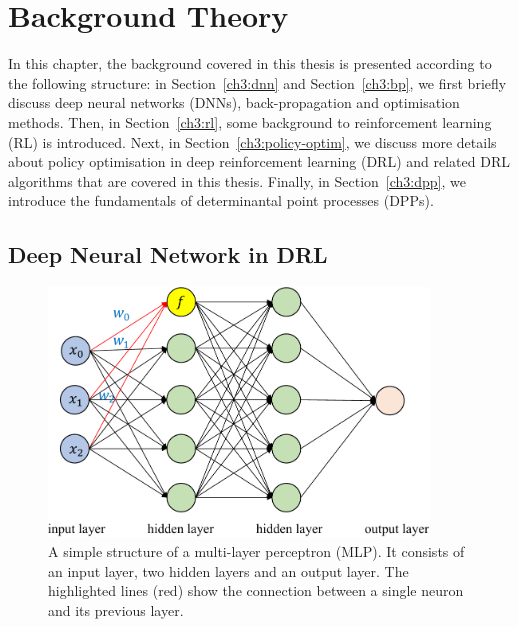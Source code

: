 \chapter{Background Theory}

\label{ch:background}
In this chapter, the background covered in this thesis is presented according to the following structure: in Section~\ref{ch3:dnn} and Section~\ref{ch3:bp}, we first briefly discuss deep neural networks (DNNs), back-propagation and optimisation methods. Then, in Section~\ref{ch3:rl}, some background to reinforcement learning (RL) is introduced. Next, in Section~\ref{ch3:policy-optim}, we discuss more details about policy optimisation in deep reinforcement learning (DRL) and related DRL algorithms that are covered in this thesis. Finally, in Section~\ref{ch3:dpp}, we introduce the fundamentals of determinantal point processes (DPPs).

\section{Deep Neural Network in DRL}
\begin{figure}[h]
    \centering
    \includegraphics[width=0.9\textwidth]{figures/background/NN.pdf}
    \caption[A simple Structure of an MLP.]{A simple structure of a multi-layer perceptron (MLP). It consists of an input layer, two hidden layers and an output layer. The highlighted lines (red) show the connection between a single neuron and its previous layer.}
    \label{fig:nn}
\end{figure}
\label{ch3:dnn}
